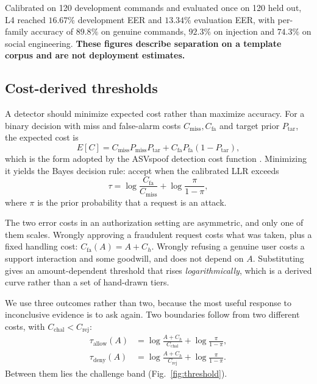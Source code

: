 \documentclass[conference]{IEEEtran}
\begin{document}
Calibrated on 120 development commands and evaluated once on 120 held out, L4
reached $16.67\%$ development EER and $13.34\%$ evaluation EER, with
per-family accuracy of $89.8\%$ on genuine commands, $92.3\%$ on injection and
$74.3\%$ on social engineering. \textbf{These figures describe separation on a
template corpus and are not deployment estimates.}

\subsection{Cost-derived thresholds}
\label{sec:policy}

A detector should minimize expected cost rather than maximize accuracy. For a
binary decision with miss and false-alarm costs $C_{\text{miss}}, C_{\text{fa}}$
and target prior $P_{\text{tar}}$, the expected cost is
\begin{equation}
E[C] = C_{\text{miss}}P_{\text{miss}}P_{\text{tar}}
     + C_{\text{fa}}P_{\text{fa}}(1-P_{\text{tar}}),
\end{equation}
which is the form adopted by the ASVspoof detection cost function
\cite{kinnunen2018tdcf}. Minimizing it yields the Bayes decision rule: accept
when the calibrated LLR exceeds
\begin{equation}
\tau = \log\frac{C_{\text{fa}}}{C_{\text{miss}}}
     + \log\frac{\pi}{1-\pi},
\end{equation}
where $\pi$ is the prior probability that a request is an attack.

The two error costs in an authorization setting are asymmetric, and only one of
them scales. Wrongly approving a fraudulent request costs what was taken, plus
a fixed handling cost: $C_{\text{fa}}(A) = A + C_h$. Wrongly refusing a genuine
user costs a support interaction and some goodwill, and does not depend on $A$.
Substituting gives an amount-dependent threshold that rises
\emph{logarithmically}, which is a derived curve rather than a set of
hand-drawn tiers.

We use three outcomes rather than two, because the most useful response to
inconclusive evidence is to ask again. Two boundaries follow from two different
costs, with $C_{\text{chal}} < C_{\text{rej}}$:
\begin{align}
\tau_{\text{allow}}(A) &= \log\frac{A + C_h}{C_{\text{chal}}}
  + \log\frac{\pi}{1-\pi}, \label{eq:tallow}\\
\tau_{\text{deny}}(A)  &= \log\frac{A + C_h}{C_{\text{rej}}}
  + \log\frac{\pi}{1-\pi}. \label{eq:tdeny}
\end{align}
Between them lies the challenge band (Fig.~\ref{fig:threshold}).
\end{document}
